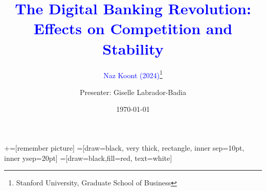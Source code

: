 \documentclass[notes,10pt, aspectratio=169]{beamer}
\title[]{\textcolor{blue}{The Digital Banking Revolution: \\
Effects on Competition and Stability}} %
\subtitle{\textcolor{blue}{Naz Koont (2024)}\footnote{
    Stanford University, Graduate School of Business
}}
\author{Presenter: Giselle Labrador-Badia}
\institute{University of Wisconsin-Madison}
\date{\today}
\begin{document}
\newcommand\marktopleft[1]{%
 \tikz[overlay,remember picture] 
 \node (marker-#1-a) at (-.3em,.3em) {};%
}
\newcommand\markbottomright[2]{%
 \tikz[overlay,remember picture] 
 \node (marker-#1-b) at (0em,0em) {};%
}
+=[remember picture] 
 =[draw=black, very thick, rectangle, inner sep=10pt, inner ysep=20pt]
 =[draw=black,fill=red, text=white]

\begin{frame}[noframenumbering]
 \maketitle
\end{frame}
\end{document}
